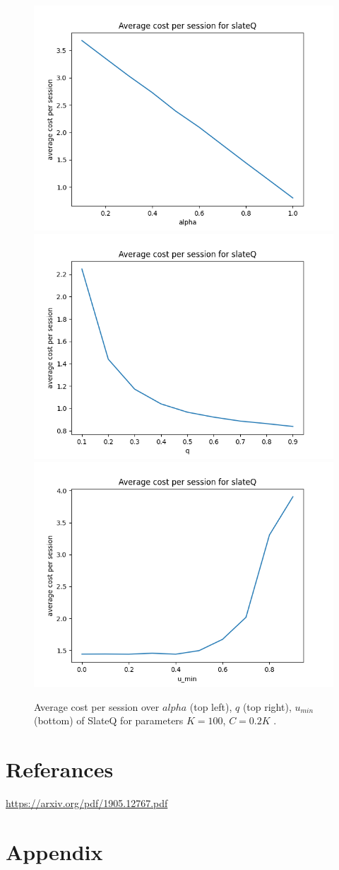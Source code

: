 \documentclass[12pt]{article}
\begin{document}
\begin{figure}[H] %
    \centering
    \includegraphics[width=0.49\linewidth]{Figure_7.png}
    \includegraphics[width=0.49\linewidth]{Figure_8.png}\\
    \includegraphics[width=0.49\linewidth]{Figure_9.png}
    \caption{Average cost per session over $alpha$ (top left), $q$ (top right), $u_{min}$ (bottom) of SlateQ for parameters $K=100$, $C=0.2K$ .}
\end{figure}
\section*{Referances}

\url{https://arxiv.org/pdf/1905.12767.pdf}\\
\section*{{\bf Appendix}}
\end{document}
